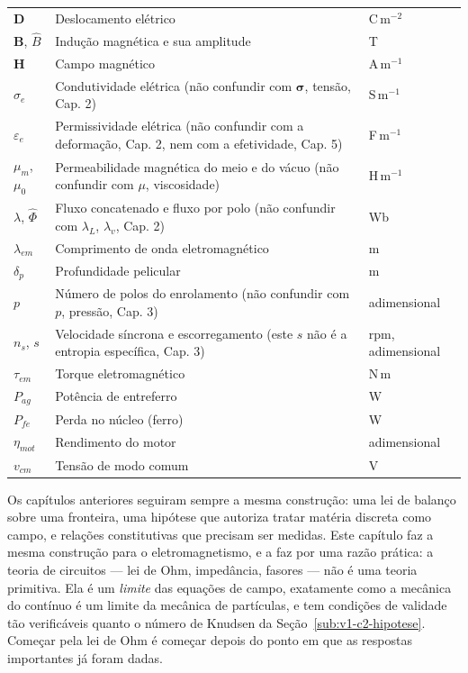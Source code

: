 \documentclass[12pt,a4paper]{article}
\numberwithin{equation}{section}
\numberwithin{table}{section}
\numberwithin{figure}{section}
\begin{document}
{\begin{longtable}{>{\raggedright\arraybackslash}p{2.6cm} >{\raggedright\arraybackslash}p{9.2cm} >{\raggedright\arraybackslash}p{2.6cm}}
	$\mathbf{D}$ & Deslocamento elétrico & C\,m$^{-2}$ \\
	$\mathbf{B}$, $\hat{B}$ & Indução magnética e sua amplitude & T \\
	$\mathbf{H}$ & Campo magnético & A\,m$^{-1}$ \\
	$\sigma_e$ & Condutividade elétrica (não confundir com $\boldsymbol{\sigma}$, tensão, Cap. 2) & S\,m$^{-1}$ \\
	$\varepsilon_e$ & Permissividade elétrica (não confundir com a deformação, Cap. 2, nem com a efetividade, Cap. 5) & F\,m$^{-1}$ \\
	$\mu_m$, $\mu_0$ & Permeabilidade magnética do meio e do vácuo (não confundir com $\mu$, viscosidade) & H\,m$^{-1}$ \\
	$\lambda$, $\hat{\Phi}$ & Fluxo concatenado e fluxo por polo (não confundir com $\lambda_L$, $\lambda_v$, Cap. 2) & Wb \\
	$\lambda_{em}$ & Comprimento de onda eletromagnético & m \\
	$\delta_p$ & Profundidade pelicular & m \\
	$p$ & Número de polos do enrolamento (não confundir com $p$, pressão, Cap. 3) & adimensional \\
	$n_s$, $s$ & Velocidade síncrona e escorregamento (este $s$ não é a entropia específica, Cap. 3) & rpm, adimensional \\
	$\tau_{em}$ & Torque eletromagnético & N\,m \\
	$P_{ag}$ & Potência de entreferro & W \\
	$P_{fe}$ & Perda no núcleo (ferro) & W \\
	$\eta_{mot}$ & Rendimento do motor & adimensional \\
	$v_{cm}$ & Tensão de modo comum & V \\
	\bottomrule
\end{longtable}
}




Os capítulos anteriores seguiram sempre a mesma construção: uma lei de balanço
sobre uma fronteira, uma hipótese que autoriza tratar matéria discreta como
campo, e relações constitutivas que precisam ser medidas. Este capítulo faz a
mesma construção para o eletromagnetismo, e a faz por uma razão prática: a
teoria de circuitos --- lei de Ohm, impedância, fasores --- não é uma teoria
primitiva. Ela é um \emph{limite} das equações de campo, exatamente como a
mecânica do contínuo é um limite da mecânica de partículas, e tem condições de
validade tão verificáveis quanto o número de Knudsen da
Seção~\ref{sub:v1-c2-hipotese}. Começar pela lei de Ohm é começar depois do
ponto em que as respostas importantes já foram dadas.
\end{document}
